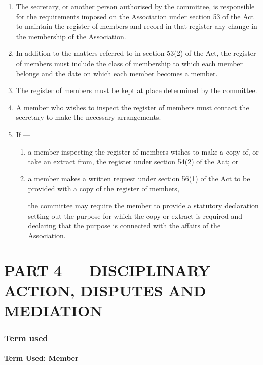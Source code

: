 \documentclass[../constitution.tex]{subfiles}
\begin{document}
\begin{enumerate}

\item The secretary, or another person authorised by the committee, is responsible for the requirements imposed on the Association under section 53 of the Act to maintain the register of members and record in that register any change in the membership of the Association.
\item In addition to the matters referred to in section 53(2) of the Act, the register of members must include the class of membership to which each member belongs and the date on which each member becomes a member.
\item The register of members must be kept at place determined by the committee.
\item A member who wishes to inspect the register of members must contact the secretary to make the necessary arrangements.
\item If ---

  \begin{enumerate}
  \item a member inspecting the register of members wishes to make a copy of, or take an extract from, the register under section 54(2) of the Act; or
  \item a member makes a written request under section 56(1) of the Act to be provided with a copy of the register of members,

    the committee may require the member to provide a statutory declaration setting out the purpose for which the copy or extract is required and declaring that the purpose is connected with the affairs of the Association.
  \end{enumerate}
\end{enumerate}

\part{PART 4 --- DISCIPLINARY ACTION, DISPUTES AND MEDIATION} \label{part-4-disciplinary-action-disputes-and-mediation}

\section{Term used} \label{division-1-term-used}

\hypertarget{term-used-member}{%
\subsection{Term Used: Member}\label{term-used-member}}
\end{document}
